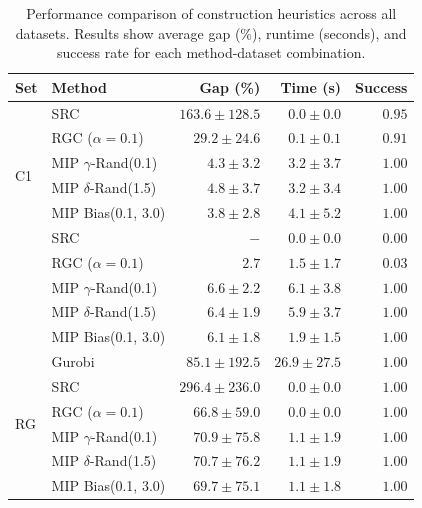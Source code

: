 \begin{table}[h]
    \caption{Performance comparison of construction heuristics across all datasets. Results show average gap (\%), runtime (seconds), and success rate for each method-dataset combination.}
    \label{tab:construction_comparison}
    \centering
    \setlength{\tabcolsep}{2.1pt}
    \begin{tabular}{llrrr}
        \toprule
        \textbf{Set} & \textbf{Method} & \textbf{Gap (\%)} & \textbf{Time (s)} & \textbf{Success} \\
        \midrule
        \multirow[c]{6}{*}{C1} & SRC & $163.6 \pm 128.5$ & $0.0 \pm 0.0$ & $0.95$ \\
        & RGC ($\alpha = 0.1$) & $29.2 \pm 24.6$ & $0.1 \pm 0.1$ & $0.91$ \\
        & MIP $\gamma$-Rand(0.1) & $4.3 \pm 3.2$ & $3.2 \pm 3.7$ & $1.00$ \\
        & MIP $\delta$-Rand(1.5) & $4.8 \pm 3.7$ & $3.2 \pm 3.4$ & $1.00$ \\
        & MIP Bias(0.1, 3.0) & $\mathbf{3.8 \pm 2.8}$ & $4.1 \pm 5.2$ & $1.00$ \\
        \midrule
        \multirow[c]{6}{*}{C2} & SRC & $-$ & $0.0 \pm 0.0$ & $0.00$ \\
        & RGC ($\alpha = 0.1$) & $2.7$ & $1.5 \pm 1.7$ & $0.03$ \\
        & MIP $\gamma$-Rand(0.1) & $6.6 \pm 2.2$ & $6.1 \pm 3.8$ & $1.00$ \\
        & MIP $\delta$-Rand(1.5) & $6.4 \pm 1.9$ & $5.9 \pm 3.7$ & $1.00$ \\
        & MIP Bias(0.1, 3.0) & $\mathbf{6.1 \pm 1.8}$ & $1.9 \pm 1.5$ & $1.00$ \\
        \midrule
        \multirow[c]{6}{*}{RG} & Gurobi & $85.1 \pm 192.5$ & $26.9 \pm 27.5$ & $1.00$ \\
        & SRC & $296.4 \pm 236.0$ & $0.0 \pm 0.0$ & $1.00$ \\
        & RGC ($\alpha = 0.1$) & $66.8 \pm 59.0$ & $0.0 \pm 0.0$ & $1.00$ \\
        & MIP $\gamma$-Rand(0.1) & $70.9 \pm 75.8$ & $1.1 \pm 1.9$ & $1.00$ \\
        & MIP $\delta$-Rand(1.5) & $70.7 \pm 76.2$ & $1.1 \pm 1.9$ & $1.00$ \\
        & MIP Bias(0.1, 3.0) & $\mathbf{69.7 \pm 75.1}$ & $1.1 \pm 1.8$ & $1.00$ \\
        \bottomrule
    \end{tabular}
\end{table}


